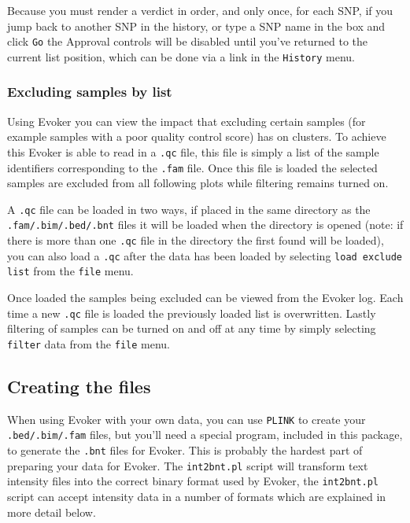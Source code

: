 \documentclass{article}
\begin{document}
Because you must render a verdict in order, and only once, for each SNP, if you jump back to another SNP in the history, or type a SNP name in the box and click \texttt{Go} the Approval controls will be disabled until you've returned to the current list position, which can be done via a link in the \texttt{History} menu.

\subsubsection{Excluding samples by list}
Using Evoker you can view the impact that excluding certain samples (for example samples with a poor quality control score) has on clusters. To achieve this Evoker is able to read in a \texttt{.qc} file, this file is simply a list of the sample identifiers corresponding to the \texttt{.fam} file. Once this file is loaded the selected samples are excluded from all following plots while filtering remains turned on.

A \texttt{.qc}  file can be loaded in two ways, if placed in the same directory as the \texttt{.fam/.bim/.bed/.bnt} files it will be loaded when the directory is opened  (note: if there is more than one \texttt{.qc} file in the directory the first found will be loaded), you can also load a  \texttt{.qc} after the data has been loaded by selecting \texttt{load exclude list} from the \texttt{file} menu. 

Once loaded the samples being excluded can be viewed from the Evoker log. Each time a new \texttt{.qc} file is loaded the previously loaded list is overwritten. Lastly filtering of samples can be turned on and off at any time by simply selecting \texttt{filter} data from the \texttt{file} menu.

\subsection{Creating the files}

When using Evoker with your own data, you can use \texttt{PLINK} to create your \texttt{.bed/.bim/.fam} files, but you'll need a special program, included in this package, to generate the \texttt{.bnt} files for Evoker. This is probably the hardest part of preparing your data for Evoker. The \texttt{int2bnt.pl} script will transform text intensity files into the correct binary format used by Evoker, the \texttt{int2bnt.pl} script can accept intensity data in a number of formats which are explained in more detail below.
\end{document}
